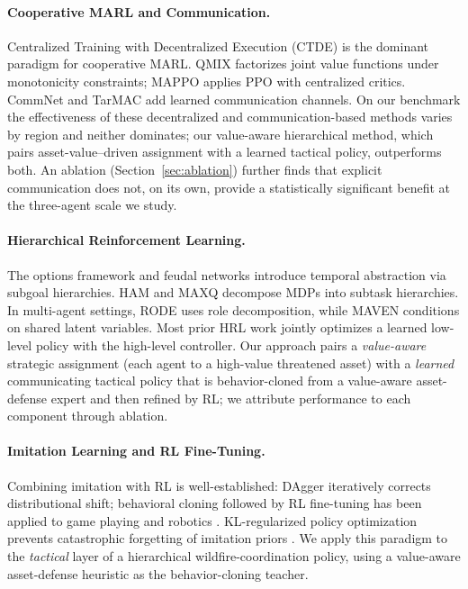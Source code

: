\documentclass[letterpaper]{article}
\begin{document}
\paragraph{Cooperative MARL and Communication.}
Centralized Training with Decentralized Execution (CTDE) is the dominant paradigm for cooperative MARL. QMIX \citep{rashid2018qmix} factorizes joint value functions under monotonicity constraints; MAPPO \citep{yu2022mappo} applies PPO \citep{schulman2017} with centralized critics. CommNet \citep{sukhbaatar2016learning} and TarMAC \citep{das2019tarmac} add learned communication channels. On our benchmark the effectiveness of these decentralized and communication-based methods varies by region and neither dominates; our value-aware hierarchical method, which pairs asset-value--driven assignment with a learned tactical policy, outperforms both. An ablation (Section~\ref{sec:ablation}) further finds that explicit communication does not, on its own, provide a statistically significant benefit at the three-agent scale we study.

\paragraph{Hierarchical Reinforcement Learning.}
The options framework \citep{sutton1999options} and feudal networks \citep{vezhnevets2017feudal} introduce temporal abstraction via subgoal hierarchies. HAM \citep{parr1998hams} and MAXQ \citep{dietterich2000maxq} decompose MDPs into subtask hierarchies. In multi-agent settings, RODE \citep{wang2021rode} uses role decomposition, while MAVEN \citep{mahajan2019maven} conditions on shared latent variables. Most prior HRL work jointly optimizes a learned low-level policy with the high-level controller. Our approach pairs a \emph{value-aware} strategic assignment (each agent to a high-value threatened asset) with a \emph{learned} communicating tactical policy that is behavior-cloned from a value-aware asset-defense expert and then refined by RL; we attribute performance to each component through ablation.

\paragraph{Imitation Learning and RL Fine-Tuning.}
Combining imitation with RL is well-established: DAgger \citep{ross2011reduction} iteratively corrects distributional shift; behavioral cloning followed by RL fine-tuning has been applied to game playing \citep{silver2016mastering} and robotics \citep{rajeswaran2017learning}. KL-regularized policy optimization prevents catastrophic forgetting of imitation priors \citep{wu2019behavior}. We apply this paradigm to the \emph{tactical} layer of a hierarchical wildfire-coordination policy, using a value-aware asset-defense heuristic as the behavior-cloning teacher.
\end{document}
